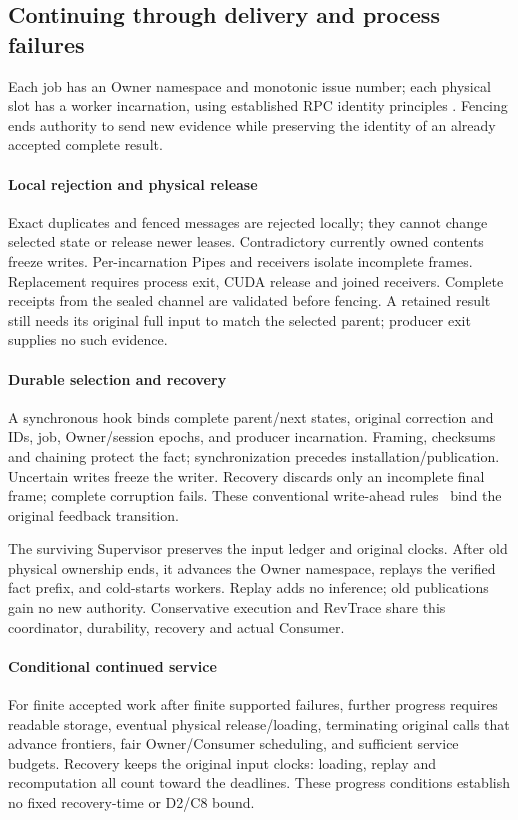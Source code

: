\subsection{Continuing through delivery and process failures}
\label{subsec:native_resilience}
Each job has an Owner namespace and monotonic issue number; each physical
slot has a worker incarnation, using established RPC identity principles
\cite{birrell1984rpc}. Fencing ends authority to send new evidence while
preserving the identity of an already accepted complete result.

\paragraph{Local rejection and physical release}
Exact duplicates and fenced messages are rejected locally; they cannot
change selected state or release newer leases. Contradictory currently
owned contents freeze writes. Per-incarnation Pipes and receivers isolate
incomplete frames. Replacement requires process exit, CUDA release and
joined receivers. Complete receipts from the sealed channel are validated
before fencing. A retained result still needs its original full input to
match the selected parent; producer exit supplies no such evidence.

\paragraph{Durable selection and recovery}
A synchronous hook binds complete parent/next states, original correction
and IDs, job, Owner/session epochs, and producer incarnation. Framing,
checksums and chaining protect the fact; synchronization precedes
installation/publication. Uncertain writes freeze the writer. Recovery
discards only an incomplete final frame; complete corruption fails.
These conventional write-ahead rules~\cite{mohan1992aries} bind the
original feedback transition.

The surviving Supervisor preserves the input ledger and original clocks.
After old physical ownership ends, it advances the Owner namespace,
replays the verified fact prefix, and cold-starts workers. Replay adds no
inference; old publications gain no new authority. Conservative execution
and RevTrace share this coordinator, durability, recovery and actual Consumer.

\paragraph{Conditional continued service}
\label{prop:continued_service}
For finite accepted work after finite supported failures, further progress
requires readable storage, eventual physical release/loading, terminating
original calls that advance frontiers, fair Owner/Consumer scheduling,
and sufficient service budgets. Recovery keeps the original input clocks:
loading, replay and recomputation all count toward the deadlines. These
progress conditions establish no fixed recovery-time or D2/C8 bound.

